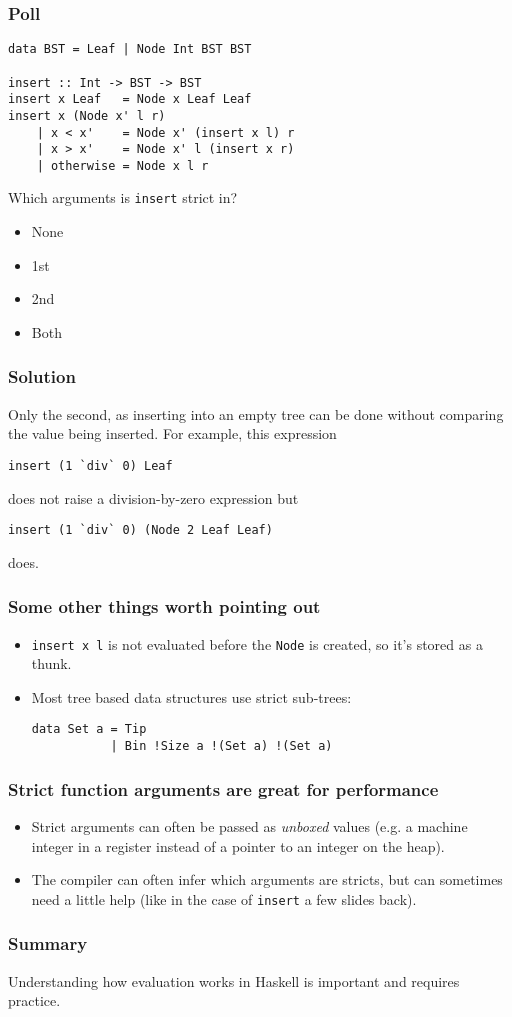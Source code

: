 \documentclass{beamer}
\begin{document}
\begin{frame}[fragile]
  \frametitle{Poll}

  \begin{lstlisting}
data BST = Leaf | Node Int BST BST

insert :: Int -> BST -> BST
insert x Leaf   = Node x Leaf Leaf
insert x (Node x' l r)
    | x < x'    = Node x' (insert x l) r
    | x > x'    = Node x' l (insert x r)
    | otherwise = Node x l r
  \end{lstlisting}

  Which arguments is \lstinline!insert! strict in?

  \begin{itemize}
  \item None
  \item 1st
  \item 2nd
  \item Both
  \end{itemize}
\end{frame}

\begin{frame}[fragile]
  \frametitle{Solution}

  Only the second, as inserting into an empty tree can be done without
  comparing the value being inserted.  For example, this expression
  \begin{lstlisting}
insert (1 `div` 0) Leaf
  \end{lstlisting}
does not raise a division-by-zero expression but
  \begin{lstlisting}
insert (1 `div` 0) (Node 2 Leaf Leaf)
  \end{lstlisting}
does.
\end{frame}

\begin{frame}[fragile]
  \frametitle{Some other things worth pointing out}

  \begin{itemize}
  \item \lstinline!insert x l! is not evaluated before the
    \lstinline!Node! is created, so it's stored as a thunk.
  \item Most tree based data structures use strict sub-trees:
    \begin{lstlisting}
data Set a = Tip 
           | Bin !Size a !(Set a) !(Set a) 
    \end{lstlisting}
  \end{itemize}
\end{frame}

\begin{frame}[fragile]
  \frametitle{Strict function arguments are great for performance}

  \begin{itemize}
  \item Strict arguments can often be passed as \emph{unboxed} values
    (e.g. a machine integer in a register instead of a pointer to an
    integer on the heap).
  \item The compiler can often infer which arguments are stricts, but
    can sometimes need a little help (like in the case of
    \lstinline!insert! a few slides back).
  \end{itemize}
\end{frame}

\begin{frame}[fragile]
  \frametitle{Summary}

  Understanding how evaluation works in Haskell is important and
  requires practice.
\end{frame}
\end{document}
